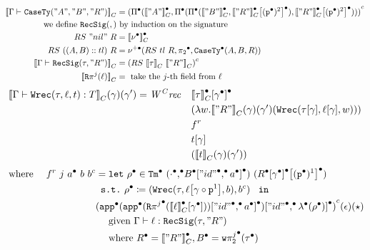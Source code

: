 \begin{align*}
  \denotesC{\goodType{\Gm}{\CaseSig{"A"}{"B"}{"R"}}{}} &= 
  \Gmodel{\GluedPi{\denotesCC{"A"}}{\GluedPi {\GluedPi{\denotesCC{"B"}}{\Gsub{\denotesCC{"R"}}{\GSubstWeak{2}}}} {\Gsub{\denotesCC{"R"}}{\GSubstWeak{2}}}}} \\
  \text{we define } \RecSig{}{} &\text{ by induction on the signature} \\
  RS~"nil"~R &= \denotesCC{\LSigEmp} \\
  RS~((A, B) :: tl)~R &= \GLSigAdd{RS~tl~R}{\Glued{\pi_2}}{\GCaseSig{A}{B}{R}} \\
  \denotesC{\goodType{\Gm}{\RecSig{\wsig}{"R"}}{}} &= \Gmodel{RS~\denotesC{\tau}~\denotesC{"R"}} \\
  \denotesC{\Recproj{j}{\lkg}} &= \text{ take the $j$-th field from } \lkg 
\end{align*}
\begin{align*}
  \denotesC{\goodTerm{\Gm}{\Wrec{\wsig}{\lkg}{t}}{T}}(\gm)(\gm') = \CWrec \quad &\Gsub{\denotesCC{\wsig}}{\Glued{\gm}} \\ 
  & (\lambda w. \denotesC{"R"}(\gm)(\gm')(\Wrec{\sub{\wsig}{\gm}}{\sub{\lkg}{\gm}}{w}))\\
  &f^r\\ &\sub{t}{\gm}\\ 
  &(\denotesC{t}(\gm)(\gm')) 
\end{align*}
\begin{align*}  
  \text{ where } \quad f^r~j~\Glued{a}~b~b^c &= 
  \texttt{let}~\Glued{\rho}  \in \GTm{(\Glued{\cdot} \Glued{,} \Gsub{\Glued{B}}{\GSubstExt{\Glued{"id"}}{\Glued{a}}})}{(\Gsub{\Gsub{\Glued{R}}{\Glued{\gm}}}{\GSubstWeak{1}})} 
  \\
  &\texttt{ s.t.}~\Glued{\rho} \coloneq (\Wrec{\wsig}{\sub{\lkg}{\SubstComp{\gm}{\SubstWeak{1}}}}{b},b^c)~\texttt{ in } \\
  & \Gmodel{\Gsub{\Gapp{\Gsub{\Gapp{\GRecproj{j}{\sub{\denotesCC{\lkg}}{\Glued{\gm}}}}}{\GSubstExt{\GSubstId}{\Glued{a}}}}}{\GSubstExt{\GSubstId}{\Glam{\Glued{\rho}}}}}(\epsilon)(\star) \\
  & \quad 
   \text{ given } \goodTerm{\Gm}{\lkg}{\RecSig{\wsig}{"R"}} \\
   & \quad \text{ where }\Glued{R} = \denotesCC{"R"}, \Glued{B} = \Gwsigproj{j}{2}{\Glued{\wsig}}
\end{align*}

